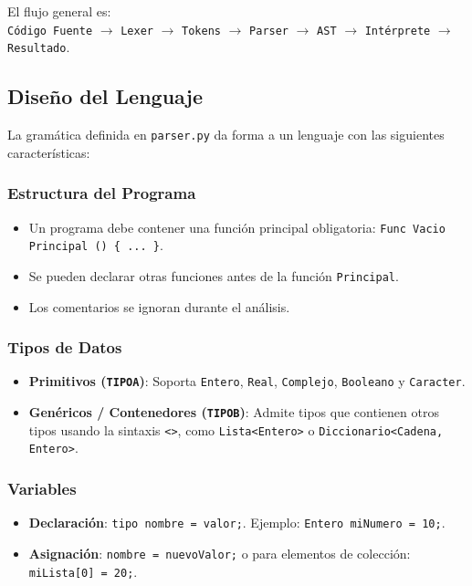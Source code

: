 \documentclass{article}
\begin{document}
El flujo general es: \\
\texttt{Código Fuente} $\rightarrow$ \texttt{Lexer} $\rightarrow$ \texttt{Tokens} $\rightarrow$ \texttt{Parser} $\rightarrow$ \texttt{AST} $\rightarrow$ \texttt{Intérprete} $\rightarrow$ \texttt{Resultado}.




\subsection{Diseño del Lenguaje}

La gramática definida en \texttt{parser.py} da forma a un lenguaje con las siguientes características:

\subsubsection{Estructura del Programa}
\begin{itemize}
    \item Un programa debe contener una función principal obligatoria: \texttt{Func Vacio Principal () \{ ... \}}.
    \item Se pueden declarar otras funciones antes de la función \texttt{Principal}.
    \item Los comentarios se ignoran durante el análisis.
\end{itemize}

\subsubsection{Tipos de Datos}
\begin{itemize}
    \item \textbf{Primitivos (\texttt{TIPOA})}: Soporta \texttt{Entero}, \texttt{Real}, \texttt{Complejo}, \texttt{Booleano} y \texttt{Caracter}.
    \item \textbf{Genéricos / Contenedores (\texttt{TIPOB})}: Admite tipos que contienen otros tipos usando la sintaxis \texttt{<>}, como \texttt{Lista<Entero>} o \texttt{Diccionario<Cadena, Entero>}.
\end{itemize}

\subsubsection{Variables}
\begin{itemize}
    \item \textbf{Declaración}: \texttt{tipo nombre = valor;}. Ejemplo: \texttt{Entero miNumero = 10;}.
    \item \textbf{Asignación}: \texttt{nombre = nuevoValor;} o para elementos de colección: \texttt{miLista[0] = 20;}.
\end{itemize}
\end{document}
